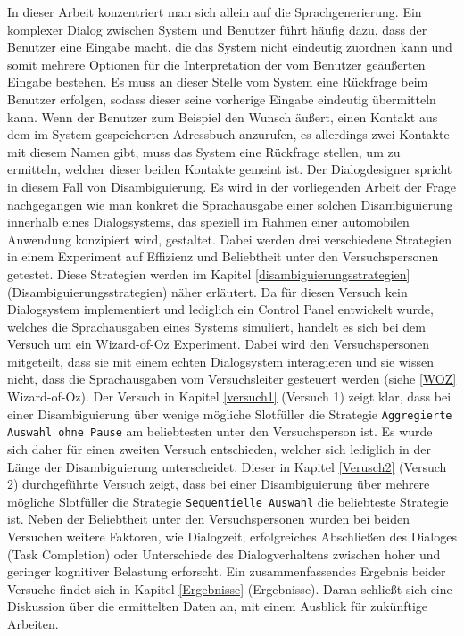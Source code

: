 \documentclass[12pt,a4paper]{scrartcl}
\begin{document}
In dieser Arbeit konzentriert man sich allein auf die Sprachgenerierung. Ein komplexer Dialog zwischen System und Benutzer führt häufig dazu, dass der Benutzer eine Eingabe macht, die das System nicht eindeutig zuordnen kann und somit mehrere Optionen für die Interpretation der vom Benutzer geäußerten Eingabe bestehen. Es muss an dieser Stelle vom System eine Rückfrage beim Benutzer erfolgen, sodass dieser seine vorherige Eingabe eindeutig übermitteln kann. Wenn der Benutzer zum Beispiel den Wunsch äußert, einen Kontakt aus dem im System gespeicherten Adressbuch anzurufen, es allerdings zwei Kontakte mit diesem Namen gibt, muss das System eine Rückfrage stellen, um zu ermitteln, welcher dieser beiden Kontakte gemeint ist. Der Dialogdesigner spricht in diesem Fall von Disambiguierung.  Es wird in der vorliegenden Arbeit der Frage nachgegangen wie man konkret die Sprachausgabe einer solchen Disambiguierung innerhalb eines Dialogsystems, das speziell im Rahmen einer automobilen Anwendung konzipiert wird, gestaltet. Dabei werden drei verschiedene Strategien in einem Experiment auf Effizienz und Beliebtheit unter den Versuchspersonen getestet. Diese Strategien werden im Kapitel \ref{disambiguierungsstrategien} (Disambiguierungsstrategien) näher erläutert. Da für diesen Versuch kein Dialogsystem implementiert und lediglich ein Control Panel entwickelt wurde, welches die Sprachausgaben eines Systems simuliert, handelt es sich bei dem Versuch um ein Wizard-of-Oz Experiment. Dabei wird den Versuchspersonen mitgeteilt, dass sie mit einem echten Dialogsystem interagieren und sie wissen nicht, dass die Sprachausgaben vom Versuchsleiter gesteuert werden (siehe \ref{WOZ} Wizard-of-Oz). Der Versuch in Kapitel \ref{versuch1}  (Versuch 1) zeigt klar, dass bei einer Disambiguierung über wenige mögliche Slotfüller die Strategie \texttt{Aggregierte Auswahl ohne Pause} am beliebtesten unter den Versuchsperson ist. Es wurde sich daher für einen zweiten Versuch entschieden, welcher sich lediglich in der Länge der Disambiguierung unterscheidet. Dieser in Kapitel \ref{Verusch2} (Versuch 2) durchgeführte Versuch zeigt, dass bei einer Disambiguierung über mehrere mögliche Slotfüller die Strategie \texttt{Sequentielle Auswahl} die beliebteste Strategie ist. Neben der Beliebtheit unter den Versuchspersonen wurden bei beiden Versuchen weitere Faktoren, wie Dialogzeit, erfolgreiches Abschließen des Dialoges (Task Completion) oder Unterschiede des Dialogverhaltens zwischen hoher und geringer kognitiver Belastung erforscht. Ein zusammenfassendes Ergebnis beider Versuche findet sich in Kapitel \ref{Ergebnisse} (Ergebnisse). Daran schließt sich eine Diskussion über die ermittelten Daten an, mit einem Ausblick für zukünftige Arbeiten. 
\end{document}
